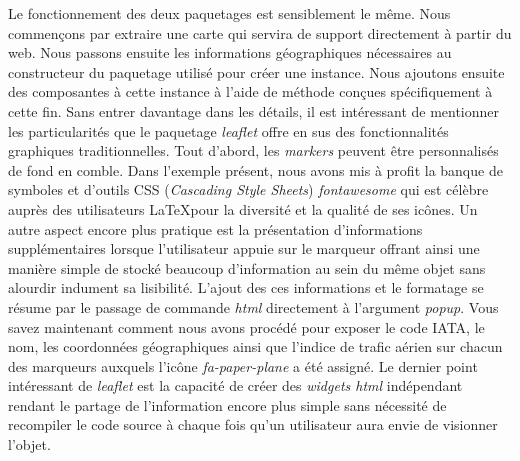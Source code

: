 \vspace{\baselineskip}
\noindent
Le fonctionnement des deux paquetages est sensiblement le même. Nous commençons par extraire une carte qui servira de support directement à partir du web. Nous passons ensuite les informations géographiques nécessaires au constructeur du paquetage utilisé pour créer une instance. Nous ajoutons ensuite des composantes à cette instance à l'aide de méthode conçues spécifiquement à cette fin. Sans entrer davantage dans les détails, il est intéressant de mentionner les particularités que le paquetage \emph{leaflet} offre en sus des fonctionnalités graphiques traditionnelles. Tout d'abord, les \emph{markers} peuvent être personnalisés de fond en comble. Dans l'exemple présent, nous avons mis à profit la banque de symboles et d'outils CSS (\emph{Cascading Style Sheets}) \emph{fontawesome} \cite{fontAwesome} qui est célèbre auprès des utilisateurs \LaTeX pour la diversité et la qualité de ses icônes. Un autre aspect encore plus pratique est la présentation d'informations supplémentaires lorsque l'utilisateur appuie sur le marqueur offrant ainsi une manière simple de stocké beaucoup d'information au sein du même objet sans alourdir indument sa lisibilité. L'ajout des ces informations et le formatage se résume par le passage de commande \emph{html} directement à l'argument \emph{popup}. Vous savez maintenant comment nous avons procédé pour exposer le code IATA, le nom, les coordonnées géographiques ainsi que l'indice de trafic aérien sur chacun des marqueurs auxquels l'icône \emph{fa-paper-plane} a été assigné. Le dernier point intéressant de \emph{leaflet} est la capacité de créer des \emph{widgets html} indépendant rendant le partage de l'information encore plus simple sans nécessité de recompiler le code source à chaque fois qu'un utilisateur aura envie de visionner l'objet. \cite{leaflet} \\

